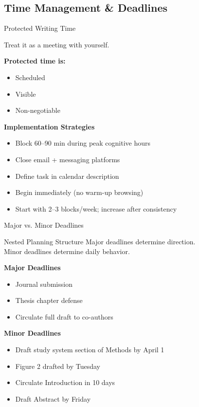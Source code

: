 \documentclass{beamer}
\begin{document}
\subsection{Time Management \& Deadlines}

\begin{frame}{Protected Writing Time}

\begin{block}{Treat it as a meeting with yourself.}
\end{block}

\textbf{Protected time is:}
\begin{itemize}
    \item Scheduled
    \item Visible
    \item Non-negotiable
\end{itemize}


\textbf{Implementation Strategies}
\begin{itemize}
    \item Block 60--90 min during peak cognitive hours
    \item Close email + messaging platforms
    \item Define task in calendar description
    \item Begin immediately (no warm-up browsing)
    \item Start with 2--3 blocks/week; increase after consistency
\end{itemize}

\end{frame}


\begin{frame}{Major vs. Minor Deadlines}

\begin{block}{Nested Planning Structure}
Major deadlines determine direction.\\
Minor deadlines determine daily behavior.
\end{block}

\textbf{Major Deadlines}
\begin{itemize}
    \item Journal submission
    \item Thesis chapter defense
    \item Circulate full draft to co-authors
\end{itemize}

\textbf{Minor Deadlines}
\begin{itemize}
    \item Draft study system section of Methods by April 1
    \item Figure 2 drafted by Tuesday
    \item Circulate Introduction in 10 days
    \item Draft Abstract by Friday
\end{itemize}

\end{frame}
\end{document}
